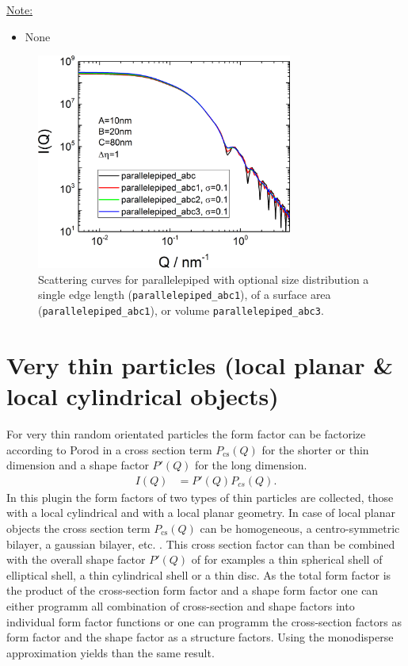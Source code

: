 \noindent\uline{Note:}
\begin{itemize}
\item None
\end{itemize}

\begin{figure}[htb]
\begin{center}
\includegraphics[width=0.75\textwidth]{../images/form_factor/anisotropic/parallelepipedABC.png}
\end{center}
\caption{Scattering curves for parallelepiped with optional size distribution a single edge length (\texttt{parallelepiped\_abc1}), of a surface area (\texttt{parallelepiped\_abc1}), or volume \texttt{parallelepiped\_abc3}.}
\label{fig:IQparallelepiped}
\end{figure}

\clearpage
\section{Very thin particles (local planar \& local cylindrical objects)}
\label{sec:very_anisotropic_particles}
For very thin random orientated particles the form factor
can be factorize according to Porod \cite{Porod1948} in a cross
section term $P_\text{cs}(Q)$ for the shorter or thin dimension and a
shape factor $P'(Q)$ for the long dimension.
\begin{align}
\label{eq:PprimePcs}
I(Q) &=P'(Q) P_{cs}(Q).
\end{align}
In this plugin the form factors of two types of thin
particles are collected, those with a local cylindrical and with a
local planar geometry. In case of local planar objects the cross
section term $P_\text{cs}(Q)$ can be homogeneous, a
centro-symmetric bilayer, a gaussian bilayer, etc. . This cross
section factor can than be combined with the overall shape factor
$P'(Q)$ of for examples a thin spherical shell of elliptical
shell, a thin cylindrical shell or a thin disc. As the total form
factor is the product of the cross-section form factor and a shape
form factor one can either programm all combination of
cross-section and shape factors into individual form factor
functions or one can programm the cross-section factors as form
factor and the shape factor as a structure factors. Using the
monodisperse approximation yields than the same result.

